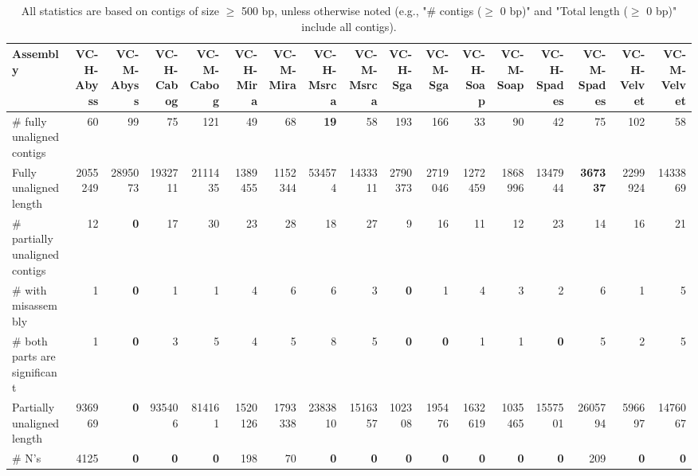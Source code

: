 \documentclass[12pt,a4paper]{article}
\begin{document}
\begin{table}[ht]
\begin{center}
\caption{All statistics are based on contigs of size $\geq$ 500 bp, unless otherwise noted (e.g., "\# contigs ($\geq$ 0 bp)" and "Total length ($\geq$ 0 bp)" include all contigs).}
\begin{tabular}{|l*{16}{|r}|}
\hline
Assembly & VC-H-Abyss & VC-M-Abyss & VC-H-Cabog & VC-M-Cabog & VC-H-Mira & VC-M-Mira & VC-H-Msrca & VC-M-Msrca & VC-H-Sga & VC-M-Sga & VC-H-Soap & VC-M-Soap & VC-H-Spades & VC-M-Spades & VC-H-Velvet & VC-M-Velvet \\ \hline
\# fully unaligned contigs & 60 & 99 & 75 & 121 & 49 & 68 & {\bf 19} & 58 & 193 & 166 & 33 & 90 & 42 & 75 & 102 & 58 \\ \hline
Fully unaligned length & 2055249 & 2895073 & 1932711 & 2111435 & 1389455 & 1152344 & 534574 & 1433311 & 2790373 & 2719046 & 1272459 & 1868996 & 1347944 & {\bf 367337} & 2299924 & 1433869 \\ \hline
\# partially unaligned contigs & 12 & {\bf 0} & 17 & 30 & 23 & 28 & 18 & 27 & 9 & 16 & 11 & 12 & 23 & 14 & 16 & 21 \\ \hline
\hspace{5mm}\# with misassembly & 1 & {\bf 0} & 1 & 1 & 4 & 6 & 6 & 3 & {\bf 0} & 1 & 4 & 3 & 2 & 6 & 1 & 5 \\ \hline
\hspace{5mm}\# both parts are significant & 1 & {\bf 0} & 3 & 5 & 4 & 5 & 8 & 5 & {\bf 0} & {\bf 0} & 1 & 1 & {\bf 0} & 5 & 2 & 5 \\ \hline
Partially unaligned length & 936969 & {\bf 0} & 935406 & 814161 & 1520126 & 1793338 & 2383810 & 1516357 & 102308 & 195476 & 1632619 & 1035465 & 1557501 & 2605794 & 596697 & 1476067 \\ \hline
\# N's & 4125 & {\bf 0} & {\bf 0} & {\bf 0} & 198 & 70 & {\bf 0} & {\bf 0} & {\bf 0} & {\bf 0} & {\bf 0} & {\bf 0} & {\bf 0} & 209 & {\bf 0} & {\bf 0} \\ \hline
\end{tabular}
\end{center}
\end{table}
\end{document}
